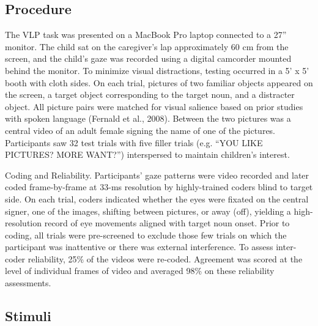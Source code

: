 \documentclass[oneside]{report}
\begin{document}
\hypertarget{procedure}{%
\subsection{Procedure}\label{procedure}}

The VLP task was presented on a MacBook Pro laptop connected to a 27''
monitor. The child sat on the caregiver's lap approximately 60 cm from
the screen, and the child's gaze was recorded using a digital camcorder
mounted behind the monitor. To minimize visual distractions, testing
occurred in a 5' x 5' booth with cloth sides. On each trial, pictures of
two familiar objects appeared on the screen, a target object
corresponding to the target noun, and a distracter object. All picture
pairs were matched for visual salience based on prior studies with
spoken language (Fernald et al., 2008). Between the two pictures was a
central video of an adult female signing the name of one of the
pictures. Participants saw 32 test trials with five filler trials (e.g.
``YOU LIKE PICTURES? MORE WANT?'') interspersed to maintain children's
interest.

Coding and Reliability. Participants' gaze patterns were video recorded
and later coded frame-by-frame at 33-ms resolution by highly-trained
coders blind to target side. On each trial, coders indicated whether the
eyes were fixated on the central signer, one of the images, shifting
between pictures, or away (off), yielding a high-resolution record of
eye movements aligned with target noun onset. Prior to coding, all
trials were pre-screened to exclude those few trials on which the
participant was inattentive or there was external interference. To
assess inter-coder reliability, 25\% of the videos were re-coded.
Agreement was scored at the level of individual frames of video and
averaged 98\% on these reliability assessments.

\hypertarget{stimuli}{%
\subsection{Stimuli}\label{stimuli}}
\end{document}
